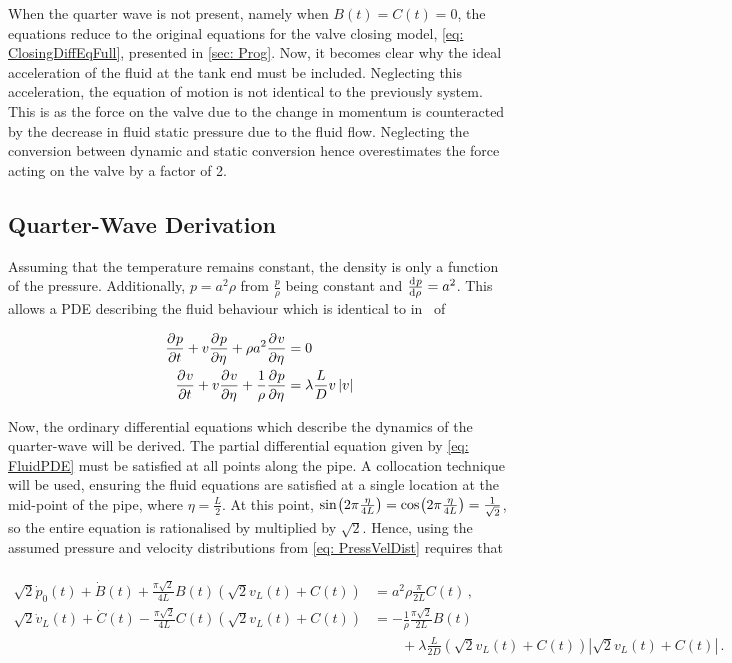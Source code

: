 When the quarter wave is not present, namely when $B(t) = C(t) = 0$, the equations reduce to the original equations for the valve closing model, \cref{eq: ClosingDiffEqFull}, presented in \cref{sec: Prog}. Now, it becomes clear why the ideal acceleration of the fluid at the tank end must be included. Neglecting this acceleration, the equation of motion is not identical to the previously system. This is as the force on the valve due to the change in momentum is counteracted by the decrease in fluid static pressure due to the fluid flow. Neglecting the conversion between dynamic and static conversion hence overestimates the force acting on the valve by a factor of 2.

\subsection{Quarter-Wave Derivation} \label{sec: QWM Derivation}

Assuming that the temperature remains constant, the density is only a function of the pressure. Additionally, $p = a^2 \rho$ from $\frac{p}{\rho}$ being constant and $\diff{p}{\rho} = a^2$. This allows a PDE describing the fluid behaviour which is identical to in~\cite{Hos2015ModelPipe} of

\begin{equation} \label{eq: FluidPDE}
\begin{split}
    \pdiff{p}{t} + v \pdiff{p}{\eta} + \rho a^2 \pdiff{v}{\eta} &= 0 \\
    \pdiff{v}{t} + v \pdiff{v}{\eta} + \frac{1}{\rho} \pdiff{p}{\eta} &= \lambda \frac{L}{D} v \left| v \right|
\end{split}
\end{equation}

Now, the ordinary differential equations which describe the dynamics of the quarter-wave will be derived. The partial differential equation given by \cref{eq: FluidPDE} must be satisfied at all points along the pipe. A collocation technique will be used, ensuring the fluid equations are satisfied at a single location at the mid-point of the pipe, where $\eta = \frac{L}{2}$. At this point, $\fun{sin}{2 \pi \frac{\eta}{4L}} = \fun{cos}{2 \pi \frac{\eta}{4L}} = \frac{1}{\sqrt{2}}$, so the entire equation is rationalised by multiplied by $\sqrt{2}$. Hence, using the assumed pressure and velocity distributions from \cref{eq: PressVelDist} requires that
~
\begin{equation*}
\begin{split}
    \sqrt{2} \dot{p}_0(t) + \dot{B}(t) + \frac{\pi \sqrt{2}}{4 L} B(t) \left( \sqrt{2} v_L(t) + C(t) \right) &= a^2 \rho \frac{\pi}{2L} C(t) \, , \\
    \sqrt{2} \dot{v}_L(t) + \dot{C}(t) - \frac{\pi \sqrt{2}}{4 L} C(t) \left( \sqrt{2} v_L(t) + C(t) \right) &= - \frac{1}{\rho} \frac{\pi \sqrt{2}}{2 L} B(t) \\
    &\qquad + \lambda \frac{L}{2D} \left( \sqrt{2} v_L(t) + C(t) \right) \left| \sqrt{2} v_L(t) + C(t) \right| \, .
\end{split}
\end{equation*}

